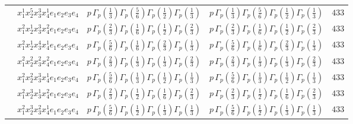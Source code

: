 \documentclass[11pt]{article}
\begin{document}
\begin{table}[ht]
{\begin{tabular}{@{}lllll@{}}
 & $x_{1}^{1} x_{2}^{5} x_{3}^{3} x_{4}^{1}  e_{1} e_{2} e_{3} e_{4}$ & $p \, \Gamma_p \left( \frac{1}{3} \right) \Gamma_p \left( \frac{5}{6} \right) \Gamma_p \left( \frac{1}{2} \right) \Gamma_p \left( \frac{1}{3} \right)$ & $p \, \Gamma_p \left( \frac{1}{3} \right) \Gamma_p \left( \frac{5}{6} \right) \Gamma_p \left( \frac{1}{2} \right) \Gamma_p \left( \frac{1}{3} \right)$ & $433$ \\
 & $x_{1}^{2} x_{2}^{1} x_{3}^{3} x_{4}^{2}  e_{1} e_{2} e_{3} e_{4}$ & $p \, \Gamma_p \left( \frac{2}{3} \right) \Gamma_p \left( \frac{1}{6} \right) \Gamma_p \left( \frac{1}{2} \right) \Gamma_p \left( \frac{2}{3} \right)$ & $p \, \Gamma_p \left( \frac{2}{3} \right) \Gamma_p \left( \frac{1}{6} \right) \Gamma_p \left( \frac{1}{2} \right) \Gamma_p \left( \frac{2}{3} \right)$ & $433$ \\
 & $x_{1}^{2} x_{2}^{1} x_{3}^{4} x_{4}^{1}  e_{1} e_{2} e_{3} e_{4}$ & $p \, \Gamma_p \left( \frac{5}{6} \right) \Gamma_p \left( \frac{1}{6} \right) \Gamma_p \left( \frac{2}{3} \right) \Gamma_p \left( \frac{1}{3} \right)$ & $p \, \Gamma_p \left( \frac{5}{6} \right) \Gamma_p \left( \frac{1}{6} \right) \Gamma_p \left( \frac{2}{3} \right) \Gamma_p \left( \frac{1}{3} \right)$ & $433$ \\
 & $x_{1}^{2} x_{2}^{2} x_{3}^{2} x_{4}^{2}  e_{1} e_{2} e_{3} e_{4}$ & $p \, \Gamma_p \left( \frac{2}{3} \right) \Gamma_p \left( \frac{1}{3} \right) \Gamma_p \left( \frac{1}{3} \right) \Gamma_p \left( \frac{2}{3} \right)$ & $p \, \Gamma_p \left( \frac{2}{3} \right) \Gamma_p \left( \frac{1}{3} \right) \Gamma_p \left( \frac{1}{3} \right) \Gamma_p \left( \frac{2}{3} \right)$ & $433$ \\
 & $x_{1}^{2} x_{2}^{2} x_{3}^{3} x_{4}^{1}  e_{1} e_{2} e_{3} e_{4}$ & $p \, \Gamma_p \left( \frac{5}{6} \right) \Gamma_p \left( \frac{1}{3} \right) \Gamma_p \left( \frac{1}{2} \right) \Gamma_p \left( \frac{1}{3} \right)$ & $p \, \Gamma_p \left( \frac{5}{6} \right) \Gamma_p \left( \frac{1}{3} \right) \Gamma_p \left( \frac{1}{2} \right) \Gamma_p \left( \frac{1}{3} \right)$ & $433$ \\
 & $x_{1}^{2} x_{2}^{3} x_{3}^{1} x_{4}^{2}  e_{1} e_{2} e_{3} e_{4}$ & $p \, \Gamma_p \left( \frac{2}{3} \right) \Gamma_p \left( \frac{1}{2} \right) \Gamma_p \left( \frac{1}{6} \right) \Gamma_p \left( \frac{2}{3} \right)$ & $p \, \Gamma_p \left( \frac{2}{3} \right) \Gamma_p \left( \frac{1}{2} \right) \Gamma_p \left( \frac{1}{6} \right) \Gamma_p \left( \frac{2}{3} \right)$ & $433$ \\
 & $x_{1}^{2} x_{2}^{3} x_{3}^{2} x_{4}^{1}  e_{1} e_{2} e_{3} e_{4}$ & $p \, \Gamma_p \left( \frac{5}{6} \right) \Gamma_p \left( \frac{1}{2} \right) \Gamma_p \left( \frac{1}{3} \right) \Gamma_p \left( \frac{1}{3} \right)$ & $p \, \Gamma_p \left( \frac{5}{6} \right) \Gamma_p \left( \frac{1}{2} \right) \Gamma_p \left( \frac{1}{3} \right) \Gamma_p \left( \frac{1}{3} \right)$ & $433$ \\

\end{tabular}}
\end{table}
\end{document}
